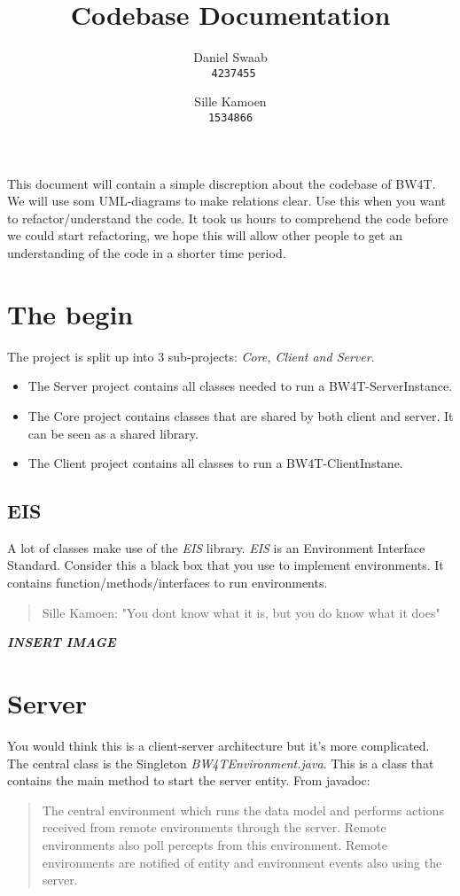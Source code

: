 \documentclass{article}
\begin{document}
\title{Codebase Documentation}
\author{Daniel Swaab\\
\texttt{ 4237455}
\and
Sille Kamoen \\
\texttt{1534866}
}
\maketitle

This document will contain a simple discreption about the codebase of BW4T. We will use som UML-diagrams to make relations clear. Use this when you want to refactor/understand the code. It took us hours to comprehend the code before we could start refactoring, we hope this will allow other people to get an understanding of the code in a shorter time period. 

\section*{The begin}
The project is split up into 3 sub-projects: \emph{Core, Client and Server}.
\begin{itemize}
	\item The Server project contains all classes needed to run a BW4T-ServerInstance.
	\item The Core project contains classes that are shared by both client and server. It can be seen as a shared library.
	\item The Client project contains all classes to run a BW4T-ClientInstane. 

\end{itemize}  
	
	\subsection*{EIS}
	A lot of classes make use of the \emph{EIS} library. \emph{EIS} is an Environment Interface Standard. Consider this a black box that you use to implement environments. It contains function/methods/interfaces to run environments. %
	\begin{quote}
		Sille Kamoen: "You dont know what it is, but you do know what it does" 
	\end{quote}
\textbf{\emph{INSERT IMAGE}}	 

\section*{Server} 
You would think this is a client-server architecture but it's more complicated. The central class is the Singleton \emph{BW4TEnvironment.java}. This is a class that contains the main method to start the server entity. From javadoc: 
\begin{quote}
The central environment which runs the data model and performs actions received from remote environments through the server. Remote environments also poll percepts from this environment. Remote environments are notified of entity and environment events also using the server. 
\end{quote}  
\end{document}

